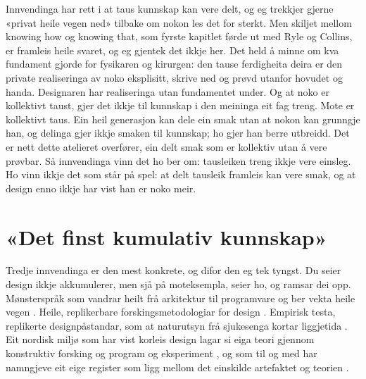 Innvendinga har rett i at taus kunnskap kan vere delt, og eg trekkjer gjerne «privat heile vegen ned» tilbake om nokon les det for sterkt. Men skiljet mellom knowing how og knowing that, som fyrste kapitlet førde ut med Ryle og Collins, er framleis heile svaret, og eg gjentek det ikkje her. Det held å minne om kva fundament gjorde for fysikaren og kirurgen: den tause ferdigheita deira er den private realiseringa av noko eksplisitt, skrive ned og prøvd utanfor hovudet og handa. Designaren har realiseringa utan fundamentet under. Og at noko er kollektivt taust, gjer det ikkje til kunnskap i den meininga eit fag treng. Mote er kollektivt taus. Ein heil generasjon kan dele ein smak utan at nokon kan grunngje han, og delinga gjer ikkje smaken til kunnskap; ho gjer han berre utbreidd. Det er nett dette atelieret overfører, ein delt smak som er kollektiv utan å vere prøvbar. Så innvendinga vinn det ho ber om: tausleiken treng ikkje vere einsleg. Ho vinn ikkje det som står på spel: at delt tausleik framleis kan vere smak, og at design enno ikkje har vist han er noko meir.

\section{«Det finst kumulativ kunnskap»}

Tredje innvendinga er den mest konkrete, og difor den eg tek tyngst. Du seier design ikkje akkumulerer, men sjå på moteksempla, seier ho, og ramsar dei opp. Mønsterspråk som vandrar heilt frå arkitektur til programvare og ber vekta heile vegen \autocite{gof1994patterns}. Heile, replikerbare forskingsmetodologiar for design \autocite{blessing2009drm}. Empirisk testa, replikerte designpåstandar, som at naturutsyn frå sjukesenga kortar liggjetida \autocite{ulrich1984view}. Eit nordisk miljø som har vist korleis design lagar si eiga teori gjennom konstruktiv forsking og program og eksperiment \autocite{redstrom2017making, sevaldson2010discussions, koskinen2011constructive}, og som til og med har namngjeve eit eige register som ligg mellom det einskilde artefaktet og teorien \autocite{lowgren2013intermediate}.

